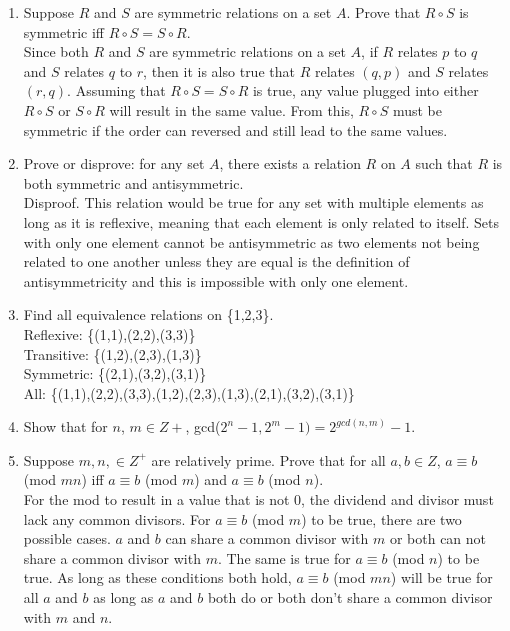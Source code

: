 \documentclass{article}
\begin{document}
\begin{enumerate}
\item Suppose $R$ and $S$ are symmetric relations on a set $A$. Prove that $R \circ S $ is symmetric iff $R \circ S = S \circ R$. \\
Since both $R$ and $S$ are symmetric relations on a set $A$, if $R$ relates $p$ to $q$ and $S$ relates $q$ to $r$, then it is also true that $R$ relates $(q, p)$ and $S$ relates $(r,q)$. Assuming that $R \circ S = S \circ R$ is true, any value plugged into either $R \circ S$ or $S \circ R$ will result in the same value. From this, $R \circ S$ must be symmetric if the order can reversed and still lead to the same values. 

\item Prove or disprove: for any set $A$, there exists a relation $R$ on $A$ such that $R$ is both symmetric and antisymmetric. \\
Disproof. This relation would be true for any set with multiple elements as long as it is reflexive, meaning that each element is only related to itself. Sets with only one element cannot be antisymmetric as two elements not being related to one another unless they are equal is the definition of antisymmetricity and this is impossible with only one element.

\item Find all equivalence relations on \{1,2,3\}. \\
Reflexive: \{(1,1),(2,2),(3,3)\} \\
Transitive: \{(1,2),(2,3),(1,3)\} \\
Symmetric: \{(2,1),(3,2),(3,1)\} \\
All: \{(1,1),(2,2),(3,3),(1,2),(2,3),(1,3),(2,1),(3,2),(3,1)\}

\item Show that for $n$, $m \in Z+$, gcd($2^n -1, 2^m -1)= 2^{gcd(n,m)} - 1$.

\item Suppose $m,n, \in Z^+$ are relatively prime. Prove that for all $a,b \in Z$, $a \equiv b$ (mod $mn$) iff $a \equiv b$ (mod $m$) and $a \equiv b$ (mod $n$). \\
For the mod to result in a value that is not 0, the dividend and divisor must lack any common divisors. For $a \equiv b$ (mod $m$) to be true, there are two possible cases. $a$ and $b$ can share a common divisor with $m$ or both can not share a common divisor with $m$. The same is true for $a \equiv b$ (mod $n$) to be true. As long as these conditions both hold, $a \equiv b$ (mod $mn$) will be true for all $a$ and $b$ as long as $a$ and $b$ both do or both don't share a common divisor with $m$ and $n$.



\end{enumerate}
\end{document}
